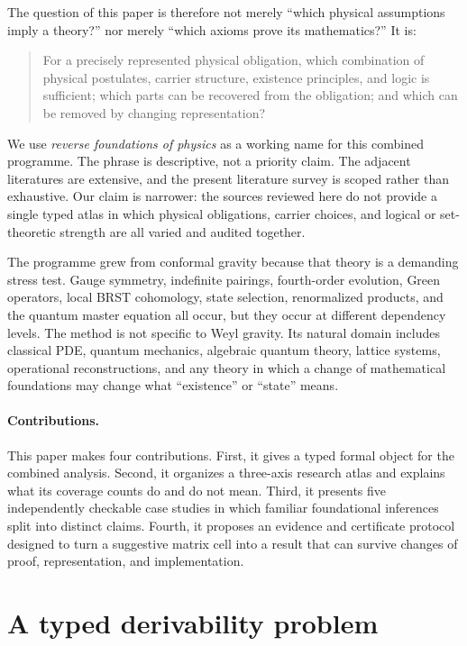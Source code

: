\documentclass[11pt]{article}
\theoremstyle{definition}
\theoremstyle{remark}
\begin{document}
The question of this paper is therefore not merely
``which physical assumptions imply a theory?'' nor merely ``which axioms prove
its mathematics?''  It is:

\begin{quote}
For a precisely represented physical obligation, which combination of
physical postulates, carrier structure, existence principles, and logic is
sufficient; which parts can be recovered from the obligation; and which can
be removed by changing representation?
\end{quote}

We use \emph{reverse foundations of physics} as a working name for this
combined programme.  The phrase is descriptive, not a priority claim.  The
adjacent literatures are extensive, and the present literature survey is
scoped rather than exhaustive.  Our claim is narrower: the sources reviewed
here do not provide a single typed atlas in which physical obligations,
carrier choices, and logical or set-theoretic strength are all varied and
audited together.

The programme grew from conformal gravity because that theory is a demanding
stress test.  Gauge symmetry, indefinite pairings, fourth-order evolution,
Green operators, local BRST cohomology, state selection, renormalized products,
and the quantum master equation all occur, but they occur at different
dependency levels.  The method is not specific to Weyl gravity.  Its natural
domain includes classical PDE, quantum mechanics, algebraic quantum theory,
lattice systems, operational reconstructions, and any theory in which a
change of mathematical foundations may change what ``existence'' or
``state'' means.

\paragraph{Contributions.}
This paper makes four contributions.  First, it gives a typed formal object
for the combined analysis.  Second, it organizes a three-axis research atlas
and explains what its coverage counts do and do not mean.  Third, it presents
five independently checkable case studies in which familiar foundational
inferences split into distinct claims.  Fourth, it proposes an evidence and
certificate protocol designed to turn a suggestive matrix cell into a result
that can survive changes of proof, representation, and implementation.

\section{A typed derivability problem}
\label{sec:formalism}
\end{document}
